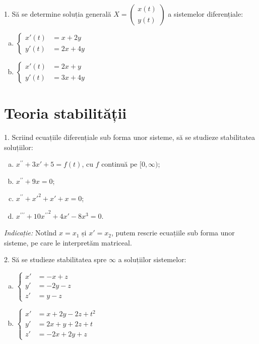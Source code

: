 \documentclass[11pt,a4paper]{article}
\theoremstyle{dotless}
\theoremstyle{dotlessdr}
\begin{document}
1. Să se determine soluția generală $ X = \begin{pmatrix} x(t) \\ y(t) \end{pmatrix} $
a sistemelor diferențiale:
\begin{enumerate}[(a)]
\item
  $
  \begin{cases}
    x'(t) &= x + 2y \\
    y'(t) &= 2x + 4y
  \end{cases}
  $
\item
  $
  \begin{cases}
    x'(t) &= 2x + y \\
    y'(t) &= 3x + 4y
  \end{cases}
  $
\end{enumerate}


\section*{Teoria stabilității}

1. Scriind ecuațiile diferențiale sub forma unor sisteme, să se studieze
stabilitatea soluțiilor:
\begin{enumerate}[(a)]
\item $ x^{\prime\prime} + 3x' + 5 = f(t) $, cu $ f $ continuă pe $ [0, \infty) $;
\item $ x^{\prime\prime} + 9x = 0 $;
\item $ x^{\prime\prime} + {x'}^2 + x' + x = 0 $;
\item $ x^{\prime\prime\prime} + 10{x^{\prime\prime}} ^2 + 4x' - 8x^3 = 0 $.
\end{enumerate}

\emph{Indicație:} Notînd $ x = x_1 $ și $ x' = x_2 $, putem rescrie ecuațiile
sub forma unor sisteme, pe care le interpretăm matriceal.

\vspace{1cm}

2. Să se studieze stabilitatea spre $ \infty $ a soluțiilor sistemelor:
\begin{enumerate}[(a)]
\item
  $
  \begin{cases}
    x' &= -x + z \\
    y' &= -2y - z \\
    z' &= y - z
  \end{cases}
  $
\item
  $
  \begin{cases}
    x' &= x + 2y - 2z + t^2 \\
    y' &= 2x + y + 2z + t \\
    z' &= -2x + 2y + z
  \end{cases}
  $
\end{enumerate}
\end{document}
